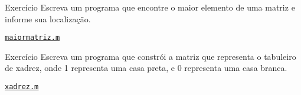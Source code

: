 \documentclass[hyperref={pdfpagelabels=false}]{beamer}
\begin{document}
\begin{frame}{Exercício}
  Escreva um programa que encontre o maior elemento de uma matriz e informe sua localização.
   \vfill 
   \begin{center} \href{listings/maiormatriz.m}{\underline{\texttt{maiormatriz.m}}} \end{center}
\end{frame}

\begin{frame}{Exercício}
  Escreva um programa que constrói a matriz que representa o tabuleiro de xadrez, onde 1 representa uma casa preta, e 0 representa uma casa branca.
	\vfill
	\begin{center} \href{listings/xadrez.m}{\underline{\texttt{xadrez.m}}} \end{center}
\end{frame}
\end{document}
